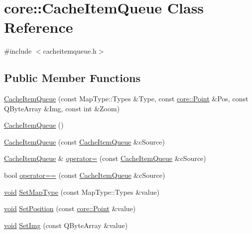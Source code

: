 \hypertarget{classcore_1_1_cache_item_queue}{\section{core\-:\-:\-Cache\-Item\-Queue \-Class \-Reference}
\label{classcore_1_1_cache_item_queue}
}


{\ttfamily \#include $<$cacheitemqueue.\-h$>$}

\subsection*{\-Public \-Member \-Functions}
\begin{DoxyCompactItemize}
\item 
\hyperlink{group___o_p_map_widget_gadc9b31f39de2abe3de6041258d92a7bd}{\-Cache\-Item\-Queue} (const \-Map\-Type\-::\-Types \&\-Type, const \hyperlink{structcore_1_1_point}{core\-::\-Point} \&\-Pos, const \-Q\-Byte\-Array \&\-Img, const int \&\-Zoom)
\item 
\hyperlink{group___o_p_map_widget_ga51cf399db0ddbbef8d48f8f8e420f373}{\-Cache\-Item\-Queue} ()
\item 
\hyperlink{group___o_p_map_widget_ga3dce0468e367c4fc113ecf651b691a9f}{\-Cache\-Item\-Queue} (const \hyperlink{classcore_1_1_cache_item_queue}{\-Cache\-Item\-Queue} \&c\-Source)
\item 
\hyperlink{classcore_1_1_cache_item_queue}{\-Cache\-Item\-Queue} \& \hyperlink{group___o_p_map_widget_gae7e315a2dbbb005c92e8d39d4e189d75}{operator=} (const \hyperlink{classcore_1_1_cache_item_queue}{\-Cache\-Item\-Queue} \&c\-Source)
\item 
bool \hyperlink{group___o_p_map_widget_ga18cc75c132d29a3dde534259ffe74e0e}{operator==} (const \hyperlink{classcore_1_1_cache_item_queue}{\-Cache\-Item\-Queue} \&c\-Source)
\item 
\hyperlink{group___u_a_v_objects_plugin_ga444cf2ff3f0ecbe028adce838d373f5c}{void} \hyperlink{group___o_p_map_widget_ga182224d6a020047e69c16ce20adb25bd}{\-Set\-Map\-Type} (const \-Map\-Type\-::\-Types \&value)
\item 
\hyperlink{group___u_a_v_objects_plugin_ga444cf2ff3f0ecbe028adce838d373f5c}{void} \hyperlink{group___o_p_map_widget_ga085e1a1de0ae2d6b9d8c6786f922c6a7}{\-Set\-Position} (const \hyperlink{structcore_1_1_point}{core\-::\-Point} \&value)
\item 
\hyperlink{group___u_a_v_objects_plugin_ga444cf2ff3f0ecbe028adce838d373f5c}{void} \hyperlink{group___o_p_map_widget_gaf1ff6340158da1ba5139ba7c442758cd}{\-Set\-Img} (const \-Q\-Byte\-Array \&value)

\end{DoxyCompactItemize}
